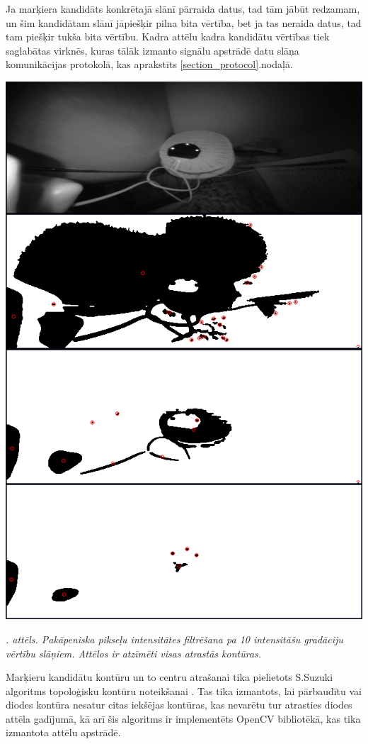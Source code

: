\documentclass[12pt, a4paper, oneside, openright]{article}
\renewcommand{\thecimages}{\arabic{cimages}}
\begin{document}
Ja marķiera kandidāts konkrētajā slānī pārraida datus, tad
tām jābūt redzamam, un šim kandidātam slānī jāpiešķir pilna bita vērtība, bet ja tas neraida datus, tad tam piešķir tukša bita vērtību.
Kadra attēlu kadra kandidātu vērtības tiek saglabātas virknēs, kuras tālāk izmanto signālu apstrādē datu slāņa komunikācijas protokolā, kas
aprakstīts \ref{section_protocol}.nodaļā.

\label{cimages:theresholds}
\vspace{10pt}
\begin{samepage}
\begin{center}
\includegraphics[height=1.2\columnwidth]{images/theresholds.png}
\begin{center}
\footnotesize{
\textit{\thecimages. attēls. Pakāpeniska pikseļu intensitātes filtrēšana pa 10 intensitāšu gradāciju vērtību slāņiem. Attēlos ir atzīmēti visas atrastās kontūras.}}
\end{center}
\end{center}
\end{samepage}
\newpage

\par
Marķieru kandidātu kontūru un to centru atrašanai tika pielietots S.Suzuki algoritms topoloģisku kontūru noteikšanai \cite{SatoshiSuzuki1985}.
Tas tika izmantots, lai pārbaudītu vai diodes kontūra nesatur citas iekšējas kontūras, kas nevarētu tur atrasties
diodes attēla gadījumā, kā arī šis algoritms ir implementēts OpenCV bibliotēkā, kas tika izmantota attēlu apstrādē.
\end{document}
